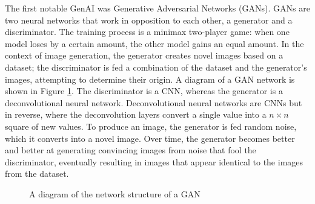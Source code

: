 The first notable GenAI was Generative Adversarial Networks (GANs)\cite{goodfellow2014generative}. GANs are two neural networks that work in opposition to each other, a generator and a discriminator. The training process is a minimax two-player game: when one model loses by a certain amount, the other model gains an equal amount. In the context of image generation, the generator creates novel images based on a dataset; the discriminator is fed a combination of the dataset and the generator's images, attempting to determine their origin. A diagram of a GAN network is shown in Figure \ref{fig:gan-diagram}. The discriminator is a CNN, whereas the generator is a deconvolutional neural network\cite{zeiler2011adaptive}. Deconvolutional neural networks are CNNs but in reverse, where the deconvolution layers convert a single value into a $n \times n$ square of new values. To produce an image, the generator is fed random noise, which it converts into a novel image. Over time, the generator becomes better and better at generating convincing images from noise that fool the discriminator, eventually resulting in images that appear identical to the images from the dataset. 

\begin{figure}[H]
    \centering
    \caption{A diagram of the network structure of a GAN}
    \label{fig:gan-diagram}
\end{figure}

